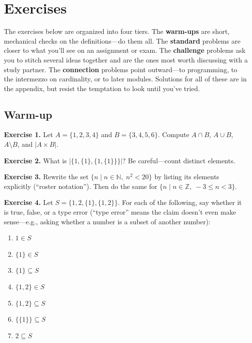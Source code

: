 \documentclass[11pt]{article}
\begin{document}
\section{Exercises}

The exercises below are organized into four tiers. The \textbf{warm-ups} are short, mechanical checks on the definitions---do them all. The \textbf{standard} problems are closer to what you'll see on an assignment or exam. The \textbf{challenge} problems ask you to stitch several ideas together and are the ones most worth discussing with a study partner. The \textbf{connection} problems point outward---to programming, to the intermezzo on cardinality, or to later modules. Solutions for all of these are in the appendix, but resist the temptation to look until you've tried.

\subsection*{Warm-up}

\textbf{Exercise 1.}\label{ex:m1:1} Let $A = \{1, 2, 3, 4\}$ and $B = \{3, 4, 5, 6\}$. Compute $A \cap B$, $A \cup B$, $A \setminus B$, and $|A \times B|$.

\bigskip
\noindent\textbf{Exercise 2.}\label{ex:m1:2} What is $|\{1, \{1\}, \{1, \{1\}\}\}|$? Be careful---count distinct elements.

\bigskip
\noindent\textbf{Exercise 3.}\label{ex:m1:3} Rewrite the set $\{n \mid n \in \mathbb{N},\; n^2 < 20\}$ by listing its elements explicitly (``roster notation''). Then do the same for $\{n \mid n \in \mathbb{Z},\; -3 \leq n < 3\}$.

\bigskip
\noindent\textbf{Exercise 4.}\label{ex:m1:4} Let $S = \{1, 2, \{1\}, \{1, 2\}\}$. For each of the following, say whether it is true, false, or a type error (``type error'' means the claim doesn't even make sense---e.g., asking whether a number is a subset of another number):
\begin{enumerate}[label=(\alph*)]
  \item $1 \in S$
  \item $\{1\} \in S$
  \item $\{1\} \subseteq S$
  \item $\{1, 2\} \in S$
  \item $\{1, 2\} \subseteq S$
  \item $\{\{1\}\} \subseteq S$
  \item $2 \subseteq S$
\end{enumerate}
\end{document}
